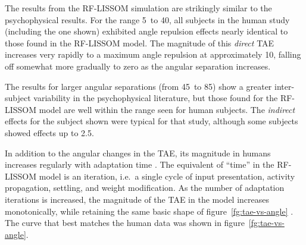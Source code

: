 \documentclass[10pt]{article}   %
\begin{document}
The results from the RF-LISSOM simulation are strikingly similar to 
the psychophysical results.  For the range 5\degree\ to 40\degree, all
subjects in the human study (including the one shown) exhibited angle
repulsion effects nearly identical to those found in the RF-LISSOM
model.  The magnitude of this {\em direct\/} TAE increases very rapidly
to a maximum angle repulsion at approximately 10\degree, falling off
somewhat more gradually to zero as the angular separation increases.

The results for larger angular separations (from 45\degree\ to 85\degree)
show a greater inter-subject variability in the psychophysical
literature, but those found for the RF-LISSOM model are well within
the range seen for human subjects.  The {\em indirect\/} effects for
the subject shown were typical for that study, although some subjects
showed effects up to 2.5\degree.  


In addition to the angular changes in the TAE, its magnitude in humans
increases regularly with adaptation time \cite{gibson:adaptation}.
The equivalent of ``time'' in the RF-LISSOM model is an iteration,
i.e.\ a single cycle of input presentation, activity propagation,
settling, and weight modification.  As the number of adaptation
iterations is increased, the magnitude of the TAE in the model
increases monotonically, while retaining the same basic shape of
figure~\ref{fg:tae-vs-angle} \cite{bednar:aitr97}.  The curve
that best matches the human data was shown in
figure~\ref{fg:tae-vs-angle}. 
\end{document}
